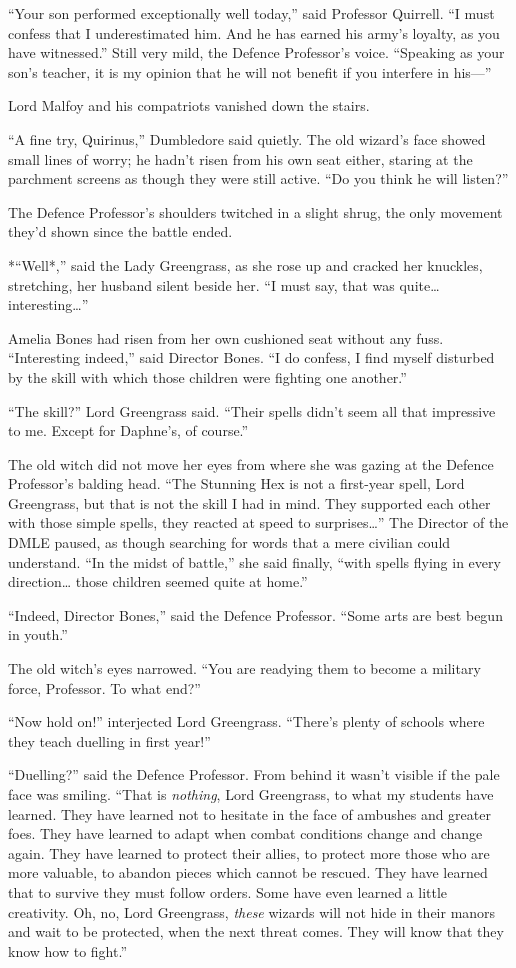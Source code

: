 ``Your son performed exceptionally well today,'' said Professor
Quirrell. ``I must confess that I underestimated him. And he has earned
his army's loyalty, as you have witnessed.'' Still very mild, the
Defence Professor's voice. ``Speaking as your son's teacher, it is my
opinion that he will not benefit if you interfere in his---''

Lord Malfoy and his compatriots vanished down the stairs.

``A fine try, Quirinus,'' Dumbledore said quietly. The old wizard's face
showed small lines of worry; he hadn't risen from his own seat either,
staring at the parchment screens as though they were still active. ``Do
you think he will listen?''

The Defence Professor's shoulders twitched in a slight shrug, the only
movement they'd shown since the battle ended.

*``Well*,'' said the Lady Greengrass, as she rose up and cracked her
knuckles, stretching, her husband silent beside her. ``I must say, that
was quite\ldots{} interesting\ldots{}''

Amelia Bones had risen from her own cushioned seat without any fuss.
``Interesting indeed,'' said Director Bones. ``I do confess, I find
myself disturbed by the skill with which those children were fighting
one another.''

``The skill?'' Lord Greengrass said. ``Their spells didn't seem all that
impressive to me. Except for Daphne's, of course.''

The old witch did not move her eyes from where she was gazing at the
Defence Professor's balding head. ``The Stunning Hex is not a first-year
spell, Lord Greengrass, but that is not the skill I had in mind. They
supported each other with those simple spells, they reacted at speed to
surprises\ldots{}'' The Director of the DMLE paused, as though searching
for words that a mere civilian could understand. ``In the midst of
battle,'' she said finally, ``with spells flying in every
direction\ldots{} those children seemed quite at home.''

``Indeed, Director Bones,'' said the Defence Professor. ``Some arts are
best begun in youth.''

The old witch's eyes narrowed. ``You are readying them to become a
military force, Professor. To what end?''

``Now hold on!'' interjected Lord Greengrass. ``There's plenty of
schools where they teach duelling in first year!''

``Duelling?'' said the Defence Professor. From behind it wasn't visible
if the pale face was smiling. ``That is \emph{nothing}, Lord Greengrass,
to what my students have learned. They have learned not to hesitate in
the face of ambushes and greater foes. They have learned to adapt when
combat conditions change and change again. They have learned to protect
their allies, to protect more those who are more valuable, to abandon
pieces which cannot be rescued. They have learned that to survive they
must follow orders. Some have even learned a little creativity. Oh, no,
Lord Greengrass, \emph{these} wizards will not hide in their manors and
wait to be protected, when the next threat comes. They will know that
they know how to fight.''

